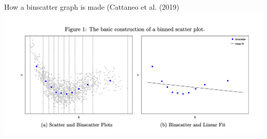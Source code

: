 \documentclass[notes,11pt, aspectratio=169]{beamer}
\begin{document}
\begin{frame}{How a binscatter graph is made (Cattaneo et al. (2019)}
  \includegraphics[width=\linewidth]{binscatter_crump.png}
\end{frame}
\end{document}
